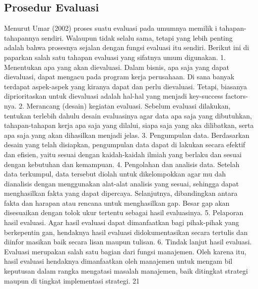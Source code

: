 \subsection{Prosedur Evaluasi}
Menurut Umar (2002) proses suatu evaluasi pada umumnya memilik i tahapan-tahapannya sendiri. Walaupun tidak selalu sama, tetapi yang lebih penting adalah bahwa prosesnya sejalan dengan fungsi evaluasi itu sendiri. Berikut ini di paparkan salah satu tahapan evaluasi yang sifatnya umum digunakan. 1. Menentukan apa yang akan dievaluasi. Dalam bisnis, apa saja yang dapat dievaluasi, dapat mengacu pada program kerja perusahaan. Di sana banyak terdapat aspek-aspek yang kiranya dapat dan perlu dievaluasi. Tetapi, biasanya diprioritaskan untuk dievaluasi adalah hal-hal yang menjadi key-success factors-nya. 2. Merancang (desain) kegiatan evaluasi. Sebelum evaluasi dilakukan, tentukan terlebih dahulu desain evaluasinya agar data apa saja yang dibutuhkan, tahapan-tahapan kerja apa saja yang dilalui, siapa saja yang aka dilibatkan, serta apa saja yang akan dihasilkan menjadi jelas. 3. Pengumpulan data. Berdasarkan desain yang telah disiapkan, pengumpulan data dapat di lakukan secara efektif dan efisien, yaitu sesuai dengan kaidah-kaidah ilmiah yang berlaku dan sesuai dengan kebutuhan dan kemampuan. 4. Pengolahan dan analisis data. Setelah data terkumpul, data tersebut diolah untuk dikelompokkan agar mu dah dianalisis dengan menggunakan alat-alat analisis yang sesuai, sehingga dapat menghasilkan fakta yang dapat dipercaya. Selanjutnya, dibandingkan antara fakta dan harapan atau rencana untuk menghasilkan gap. Besar gap akan disesuaikan dengan tolok ukur tertentu sebagai hasil evaluasinya. 5. Pelaporan hasil evaluasi. Agar hasil evaluasi dapat dimanfaatkan bagi pihak-pihak yang berkepentin gan, hendaknya hasil evaluasi didokumentasikan secara tertulis dan diinfor masikan baik secara lisan maupun tulisan. 6. Tindak lanjut hasil evaluasi. Evaluasi merupakan salah satu bagian dari fungsi manajemen. Oleh karena itu, hasil evaluasi hendaknya dimanfaatkan oleh manajemen untuk mengam bil keputusan dalam rangka mengatasi masalah manajemen, baik ditingkat strategi maupun di tingkat implementasi strategi. 21

